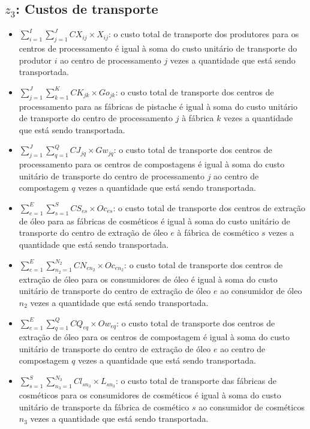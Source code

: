 \documentclass[]{article}
\begin{document}
		\subsection{$z_3$: Custos de transporte}

			\begin{itemize}
				\item $\sum\limits_{i=1}^I\sum\limits_{j=1}^J CX_{ij}\times X_{ij}$: o custo total de transporte dos produtores para os centros de processamento é igual à soma do custo unitário de transporte do produtor $i$ ao centro de processamento $j$ vezes a quantidade que está sendo transportada.
				\item $\sum\limits_{j=1}^J\sum\limits_{k=1}^K CK_{jk}\times Go_{jk}$: o custo total de transporte dos centros de processamento para as fábricas de pistache é igual à soma do custo unitário de transporte do centro de processamento $j$ à fábrica $k$ vezes a quantidade que está sendo transportada.
				\item $\sum\limits_{j=1}^J\sum\limits_{q=1}^Q CJ_{jq}\times Gw_{jq}$: o custo total de transporte dos centros de processamento para os centros de compostagens é igual à soma do custo unitário de transporte do centro de processamento $j$ ao centro de compostagem $q$ vezes a quantidade que está sendo transportada.
				\item $\sum\limits_{e=1}^E\sum\limits_{s=1}^S CS_{es}\times Oc_{es}$: o custo total de transporte dos centros de extração de óleo para as fábricas de cosméticos é igual à soma do custo unitário de transporte do centro de extração de óleo $e$ à fábrica de cosmético $s$ vezes a quantidade que está sendo transportada.
				\item $\sum\limits_{e=1}^E\sum\limits_{n_2=1}^{N_2} CN_{en_2}\times Oc_{en_2}$: o custo total de transporte dos centros de extração de óleo para os consumidores de óleo é igual à soma do custo unitário de transporte do centro de extração de óleo $e$ ao consumidor de óleo $n_2$ vezes a quantidade que está sendo transportada.
				\item $\sum\limits_{e=1}^E\sum\limits_{q=1}^Q CQ_{eq}\times Ow_{eq}$: o custo total de transporte dos centros de extração de óleo para os centros de compostagem é igual à soma do custo unitário de transporte do centro de extração de óleo $e$ ao centro de compostagem $q$ vezes a quantidade que está sendo transportada.
				\item $\sum\limits_{s=1}^S\sum\limits_{n_3=1}^{N_3} Cl_{sn_3}\times L_{sn_3}$: o custo total de transporte das fábricas de cosméticos para os consumidores de cosméticos é igual à soma do custo unitário de transporte da fábrica de cosmético $s$ ao consumidor de cosméticos $n_3$ vezes a quantidade que está sendo transportada.

\end{itemize}
\end{document}
